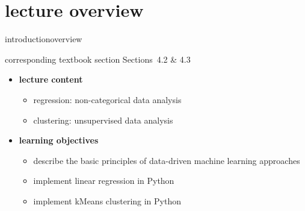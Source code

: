 


\subtitle{Module 4.2: Regression \& Clustering}


	

    \section[overview]{lecture overview}
        \begin{frame}{introduction}{overview}
            \begin{block}{corresponding textbook section}
                    Sections~4.2 \& 4.3
            \end{block}

            \begin{itemize}
                \item   \textbf{lecture content}
                    \begin{itemize}
                        \item   regression: non-categorical data analysis
                        \item   clustering: unsupervised data analysis
                    \end{itemize}
                \bigskip
                \item<2->   \textbf{learning objectives}
                    \begin{itemize}
                        \item   describe the basic principles of data-driven machine learning approaches
                        \item   implement linear regression in Python
                        \item   implement kMeans clustering in Python 
                    \end{itemize}
            \end{itemize}
        \end{frame}

